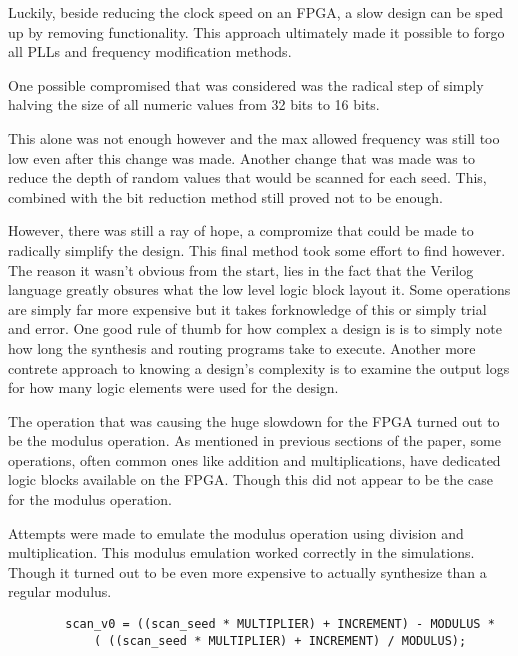 \documentclass{article}
\begin{document}
    Luckily, beside reducing the clock speed on an FPGA, a slow design
    can be sped up by removing functionality.
    This approach ultimately made it possible to forgo all PLLs and
    frequency modification methods.

    One possible compromised that was considered was the radical step
    of simply halving the size of all numeric values from 32 bits to 16
    bits.

    This alone was not enough however and the max allowed frequency was still
    too low even after this change was made.
    Another change that was made was to reduce the depth of random values
    that would be scanned for each seed.
    This, combined with the bit reduction method still proved not to be enough.

    However, there was still a ray of hope, a compromize that could be made
    to radically simplify the design.
    This final method took some effort to find however. The reason
    it wasn't obvious from the start, lies in the fact that
    the Verilog language greatly obsures what the low level logic block
    layout it.
    Some operations are simply far more expensive but it takes forknowledge of
    this or simply trial and error.
    One good rule of thumb for how complex a design is is to simply
    note how long the synthesis and routing programs take to execute.
    Another more contrete approach to knowing a design's complexity
    is to examine the output logs for how many logic elements were
    used for the design.

    The operation that was causing the huge slowdown for the FPGA turned
    out to be the modulus operation.
    As mentioned in previous sections of the paper, some operations,
    often common ones like addition and multiplications, have dedicated
    logic blocks available on the FPGA.
    Though this did not appear to be the case for the modulus operation.

    Attempts were made to emulate the modulus operation using division
    and multiplication. This modulus emulation worked correctly in the
    simulations. Though it turned out to be even more expensive to
    actually synthesize than a regular modulus.

    \lstset{language=Verilog}

    \begin{lstlisting}
        scan_v0 = ((scan_seed * MULTIPLIER) + INCREMENT) - MODULUS *
            ( ((scan_seed * MULTIPLIER) + INCREMENT) / MODULUS);
    \end{lstlisting}   
    
\end{document}
